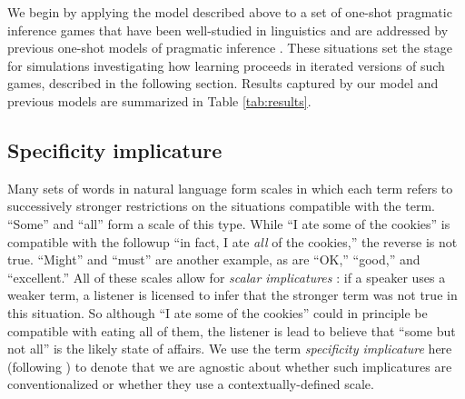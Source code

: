 \documentclass{article} %
\begin{document}
We begin by applying the model described above to a set of one-shot pragmatic inference games that have been well-studied in linguistics \cite{grice1975,horn1984} and are addressed by previous one-shot models of pragmatic inference \cite{frank2012,bergen2012}. These situations set the stage for simulations investigating how learning proceeds in iterated versions of such games, described in the following section. Results captured by our model and previous models are summarized in Table \ref{tab:results}. 



\subsection{Specificity implicature}

Many sets of words in natural language form scales in which each term refers to successively stronger restrictions on the situations compatible with the term. ``Some'' and ``all'' form a scale of this type. While ``I ate some of the cookies'' is compatible with the followup ``in fact, I ate {\it all} of the cookies,'' the reverse is not true. ``Might'' and ``must'' are another example, as are ``OK,'' ``good,'' and ``excellent.'' All of these scales allow for {\it scalar implicatures} \cite{grice1975}: if a speaker uses a weaker term, a listener is licensed to infer that the stronger term was not true in this situation. So although ``I ate some of the cookies'' could in principle be compatible with eating all of them, the listener is lead to believe that ``some but not all'' is the likely state of affairs. We use the term {\it specificity implicature} here (following \cite{bergen2012}) to denote that we are agnostic about whether such implicatures are conventionalized or whether they use a contextually-defined scale.
\end{document}
